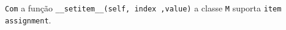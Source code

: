 \documentclass[12pt,varwidth=16cm,border=1pt]{standalone}
\begin{document}
\verb+Com+ a função \verb+__setitem__(self, index ,value)+ a classe \verb+M+  suporta \verb+item assignment+.

\questiomtrue
\end{document}
